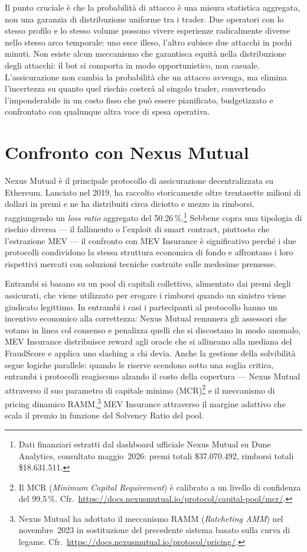 \documentclass[a4paper,11pt]{article}
\begin{document}
Il punto cruciale è che la probabilità di attacco è una misura statistica
aggregata, non una garanzia di distribuzione uniforme tra i trader. Due
operatori con lo stesso profilo e lo stesso volume possono vivere esperienze
radicalmente diverse nello stesso arco temporale: uno esce illeso, l'altro
subisce due attacchi in pochi minuti. Non esiste
alcun meccanismo che garantisca equità nella distribuzione degli attacchi: il
bot si comporta in modo opportunistico, non casuale. L'assicurazione non
cambia la probabilità che un attacco avvenga, ma elimina l'incertezza su quanto
quel rischio costerà al singolo trader, convertendo l'imponderabile in un costo
fisso che può essere pianificato, budgetizzato e confrontato con qualunque altra
voce di spesa operativa.

\section{Confronto con Nexus Mutual}

Nexus Mutual è il principale protocollo di assicurazione decentralizzata su
Ethereum. Lanciato nel 2019, ha raccolto storicamente oltre trentasette milioni
di dollari in premi e ne ha distribuiti circa diciotto e mezzo in rimborsi,
raggiungendo un \emph{loss ratio} aggregato del \num{50,26}\,\%.\footnote{Dati
finanziari estratti dal dashboard ufficiale Nexus Mutual su Dune Analytics,
consultato maggio~2026: premi totali \$37.070.492, rimborsi totali
\$18.631.511.} Sebbene copra una tipologia di rischio diversa --- il fallimento
o l'exploit di smart contract, piuttosto che l'estrazione MEV --- il confronto
con MEV Insurance è significativo perché i due protocolli condividono la stessa
struttura economica di fondo e affrontano i loro rispettivi mercati con
soluzioni tecniche costruite sulle medesime premesse.

Entrambi si basano su un pool di capitali collettivo, alimentato dai premi
degli assicurati, che viene utilizzato per erogare i rimborsi quando un
sinistro viene giudicato legittimo. In entrambi i casi i partecipanti al
protocollo hanno un incentivo economico alla correttezza: Nexus Mutual remunera
gli assessori che votano in linea col consenso e penalizza quelli che si
discostano in modo anomalo, MEV Insurance distribuisce reward agli oracle che si
allineano alla mediana del FraudScore e applica uno slashing a chi devia. Anche
la gestione della solvibilità segue logiche parallele: quando le riserve
scendono sotto una soglia critica, entrambi i protocolli reagiscono alzando il
costo della copertura --- Nexus Mutual attraverso il suo parametro di capitale
minimo (MCR)\footnote{Il MCR (\textit{Minimum Capital Requirement}) è calibrato
a un livello di confidenza del 99{,}5\,\%. Cfr.\
\url{https://docs.nexusmutual.io/protocol/capital-pool/mcr/}.} e il meccanismo
di pricing dinamico RAMM,\footnote{Nexus Mutual ha adottato il meccanismo RAMM
(\textit{Ratcheting AMM}) nel novembre~2023 in sostituzione del precedente
sistema basato sulla curva di legame. Cfr.\
\url{https://docs.nexusmutual.io/protocol/pricing/}.} MEV Insurance attraverso
il margine adattivo che scala il premio in funzione del Solvency Ratio del pool.
\end{document}
